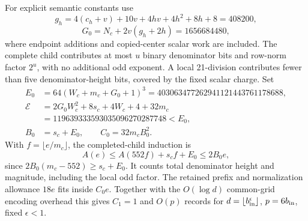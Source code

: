 For explicit semantic constants use
\[
 g_h=4(c_h+v)+10v+4hv+4h^2+8h+8=408200,
\]
\[
 G_0=N_c+2v(g_h+2h)=1656684480,
\]
where endpoint additions and copied-center scalar work are included.
The complete child contributes at most $u$ binary denominator bits
and row-norm factor $2^u$, with no additional odd exponent. A local
21-division contributes fewer than five denominator-height bits,
covered by the fixed scalar charge. Set
\[
\begin{aligned}
 E_0&=64(W_c+m_c+G_0+1)^3=403063477262941121443761178688,\\
 \mathcal E&=2G_0W_c^2+8s_c+4W_c+4+32m_c\\
           &=119639333593035096270287748<E_0,\\
 B_0&=s_c+E_0,\qquad C_0=32m_cB_0^2.
\end{aligned}
\]
With $f=\lfloor e/m_c\rfloor$, the completed-child induction is
\[
 A(e)\le A(552f)+s_cf+E_0\le2B_0e,
\]
since $2B_0(m_c-552)\ge s_c+E_0$. It counts total denominator height
and magnitude, including the local odd factor. The retained prefix and
normalization allowance $18e$ fits inside $C_0e$. Together with the
$O(\log d)$ common-grid encoding overhead this gives $C_1=1$ and
$O(p)$ records for $d=\lfloor b_{\rm in}^{\epsilon}\rfloor$,
$p=6b_{\rm in}$, fixed $\epsilon<1$.
